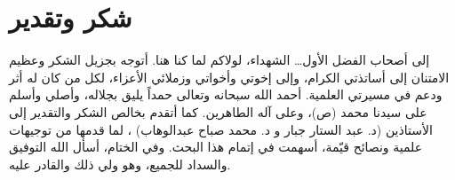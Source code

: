 \chapter*{شكر وتقدير}

\begin{center}
	\amiri
	إلى أصحاب الفضل الأول… الشهداء،
	لولاكم لما كنا هنا.
	أتوجه بجزيل الشكر وعظيم الامتنان إلى أساتذتي الكرام،
	وإلى إخوتي وأخواتي وزملائي الأعزاء،
	لكل من كان له أثر ودعم في مسيرتي العلمية.
	أحمد الله سبحانه وتعالى حمداً يليق بجلاله،
	وأصلي وأسلم على سيدنا محمد (ص)،
	وعلى آله الطاهرين.
	كما أتقدم بخالص الشكر والتقدير إلى الأستاذين
	(د. عبد الستار جبار و د. محمد صباح عبدالوهاب) ،
	لما قدمها من توجيهات علمية ونصائح قيّمة،
	أسهمت في إتمام هذا البحث.
	وفي الختام، أسأل الله التوفيق والسداد للجميع،
	وهو ولي ذلك والقادر عليه.
\end{center}